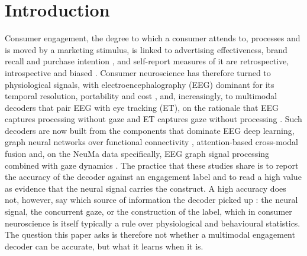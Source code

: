 \documentclass[pdflatex,sn-basic,Numbered,twocolumn,iicol]{sn-jnl}
\theoremstyle{thmstyleone}%
\theoremstyle{thmstyletwo}%
\theoremstyle{thmstylethree}%
\begin{document}
\maketitle

\section{Introduction}\label{sec:intro}

Consumer engagement, the degree to which a consumer attends to, processes and is moved by a marketing stimulus, is linked to advertising effectiveness, brand recall and purchase intention \cite{ref1,ref2}, and self-report measures of it are retrospective, introspective and biased \cite{ref2,ref3}. Consumer neuroscience has therefore turned to physiological signals, with electroencephalography (EEG) dominant for its temporal resolution, portability and cost \cite{ref1,ref6,ref7}, and, increasingly, to multimodal decoders that pair EEG with eye tracking (ET), on the rationale that EEG captures processing without gaze and ET captures gaze without processing \cite{ref8,ref11}. Such decoders are now built from the components that dominate EEG deep learning, graph neural networks over functional connectivity \cite{ref19,ref20,ref21,ref22}, attention-based cross-modal fusion \cite{ref12,ref24,ref25,ref26,ref27} and, on the NeuMa data specifically, EEG graph signal processing combined with gaze dynamics \cite{ref18}. The practice that these studies share is to report the accuracy of the decoder against an engagement label and to read a high value as evidence that the neural signal carries the construct. A high accuracy does not, however, say which source of information the decoder picked up \cite{ref64}: the neural signal, the concurrent gaze, or the construction of the label, which in consumer neuroscience is itself typically a rule over physiological and behavioural statistics. The question this paper asks is therefore not whether a multimodal engagement decoder can be accurate, but what it learns when it is.
\end{document}
